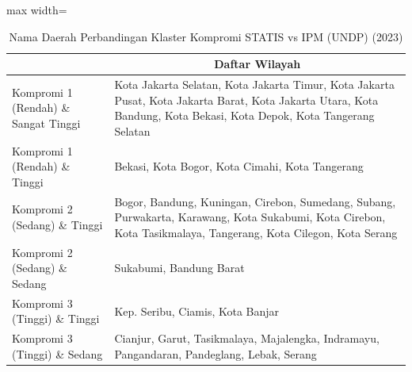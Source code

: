 \begin{table}[H]
\centering
\caption{Nama Daerah Perbandingan Klaster Kompromi STATIS vs IPM (UNDP) (2023)} \label{tab:app2comp_ipm_name_2023}
\begin{adjustbox}{max width=\textwidth}
\begin{tabular}{|>{\centering\arraybackslash}p{4cm}|p{10cm}|}
\hline
\multicolumn{1}{|c|}{\textbf{Kategori}} & \multicolumn{1}{c|}{\textbf{Daftar Wilayah}} \\
\hline
Kompromi 1 (Rendah) \& Sangat Tinggi & Kota Jakarta Selatan, Kota Jakarta Timur, Kota Jakarta Pusat, Kota Jakarta Barat, Kota Jakarta Utara, Kota Bandung, Kota Bekasi, Kota Depok, Kota Tangerang Selatan \\
\hline
Kompromi 1 (Rendah) \& Tinggi & Bekasi, Kota Bogor, Kota Cimahi, Kota Tangerang \\
\hline
Kompromi 2 (Sedang) \& Tinggi & Bogor, Bandung, Kuningan, Cirebon, Sumedang, Subang, Purwakarta, Karawang, Kota Sukabumi, Kota Cirebon, Kota Tasikmalaya, Tangerang, Kota Cilegon, Kota Serang \\
\hline
Kompromi 2 (Sedang) \& Sedang & Sukabumi, Bandung Barat \\
\hline
Kompromi 3 (Tinggi) \& Tinggi & Kep. Seribu, Ciamis, Kota Banjar \\
\hline
Kompromi 3 (Tinggi) \& Sedang & Cianjur, Garut, Tasikmalaya, Majalengka, Indramayu, Pangandaran, Pandeglang, Lebak, Serang \\
\hline
\end{tabular}
\end{adjustbox}
\end{table}